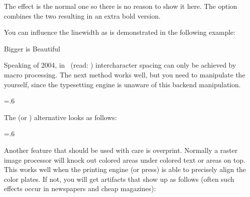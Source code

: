 \startbuffer
\bf \starteffect[outer] \stopeffect \par
\stopbuffer

\typebuffer \start \getbuffer \stop

The  effect is the normal one so there is no reason to show it here.
The  option combines the two resulting in an extra bold version.

\startbuffer
\bf \starteffect[both] \stopeffect \par
\stopbuffer

\typebuffer \start \getbuffer \stop

You can influence the linewidth as is demonstrated in the following example:

\startbuffer
\setupeffect[outer][rulethickness=.8pt]
\bfd \starteffect[outer]Bigger is Beautiful\stopeffect
\stopbuffer

\typebuffer \start \getbuffer \stop

Speaking of 2004, in \CONTEXT\ (read: \TEX) intercharacter spacing can only be
achieved by macro processing. The next method works well, but you need to
manipulate the \type {\hsize} yourself, since the typesetting engine is unaware
of this backend manipulation.

\startbuffer
\setupeffect[both][stretch=2]
\setupalign[right]
\dontleavehmode \hsize=.6\hsize
\bf \starteffect[both] \stopeffect \par
\stopbuffer

\typebuffer \start \getbuffer \stop

The  (or ) alternative looks as follows:

\startbuffer
\setupeffect[normal][stretch=2]
\setupalign[right]
\dontleavehmode \hsize=.6\hsize
\bf \starteffect[normal] \stopeffect \par
\stopbuffer

\typebuffer \start \getbuffer \stop

\subject{Overprint and knockout}

Another feature that should be used with care is overprint. Normally a raster
image processor will knock out colored areas under colored text or areas on top.
This works well when the printing engine (or press) is able to precisely align
the color plates. If not, you will get artifacts that show up as follows (often
such effects occur in newspapers and cheap magazines):


